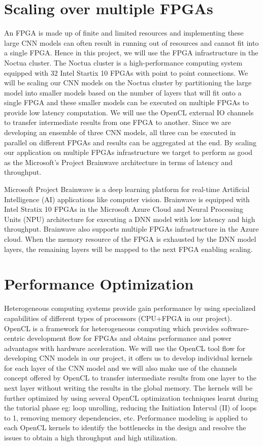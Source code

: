 \documentclass[titlepage]{report}
\begin{document}
\section{Scaling over multiple FPGAs}
An FPGA is made up of finite and limited resources and implementing these large CNN models can often result in running out of resources and cannot fit into a single FPGA. Hence in this project, we will use the FPGA infrastructure in the Noctua cluster. The Noctua cluster is a high-performance computing system equipped with 32 Intel Startix 10 FPGAs with point to point connections. We will be scaling our CNN models on the Noctua cluster by partitioning the large model into smaller models based on the number of layers that will fit onto a single FPGA and these smaller models can be executed on multiple FPGAs to provide low latency computation. We will use the OpenCL external IO channels to transfer intermediate results from one FPGA to another. Since we are developing an ensemble of three CNN models, all three can be executed in parallel on different FPGAs and results can be aggregated at the end. By scaling our application on multiple FPGAs infrastructure we target to perform as good as the Microsoft's Project Brainwave architecture in terms of latency and throughput.
\par
Microsoft Project Brainwave is a deep learning platform for real-time Artificial Intelligence (AI) applications like computer vision. Brainwave is equipped with Intel Stratix 10 FPGAs in the Microsoft Azure Cloud and Neural Processing Units (NPU) architecture for executing a DNN model with low latency and high throughput. Brainwave also supports multiple FPGAs infrastructure in the Azure cloud. When the memory resource of the FPGA is exhausted by the DNN model layers, the remaining layers will be mapped to the next FPGA enabling scaling.

\section{Performance Optimization}
Heterogeneous computing systems provide gain performance by using specialized capabilities of different types of processors (CPU+FPGA in our project). OpenCL is a framework for heterogeneous computing which provides software-centric development flow for FPGAs and obtains performance and power advantages with hardware acceleration. We will use the OpenCL tool flow for developing CNN models in our project, it offers us to develop individual kernels for each layer of the CNN model and we will also make use of the channels concept offered by OpenCL to transfer intermediate results from one layer to the next layer without writing the results in the global memory. The kernels will be further optimized by using several OpenCL optimization techniques learnt during the tutorial phase eg: loop unrolling, reducing the Initiation Interval (II) of loops to 1, removing memory dependencies, etc. Performance modeling is applied to each OpenCL kernels to identify the bottlenecks in the design and resolve the issues to obtain a high throughput and high utilization.
\end{document}
